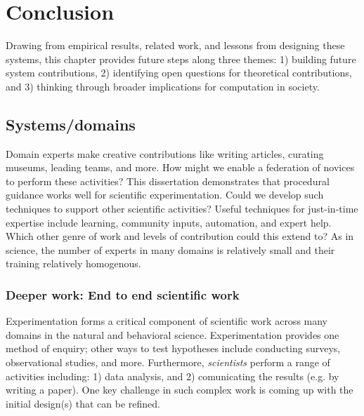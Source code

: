 
\chapter{Conclusion}
Drawing from empirical results, related work, and lessons from designing these systems, this chapter provides future steps along three themes: 1) building future system contributions, 2) identifying open questions for theoretical contributions, and 3) thinking through broader implications for computation in society.

\section{Systems/domains} 

Domain experts make creative contributions like writing articles, curating museums, leading teams, and more. How might we enable a federation of novices to perform these activities? This dissertation demonstrates that procedural guidance works well for scientific experimentation. Could we develop such techniques to support other scientific activities? Useful techniques for just-in-time expertise include learning, community inputs, automation, and expert help. Which other genre of work and levels of contribution could this extend to? As in science, the number of experts in many domains is relatively small and their training relatively homogenous. 

\subsection{Deeper work: End to end scientific work}
Experimentation forms a critical component of scientific work across many domains in the natural and behavioral science. Experimentation provides one method of enquiry; other ways to test hypotheses include conducting surveys, observational studies, and more. Furthermore, \textit{scientists} perform a range of activities including: 1) data analysis, and 2) comunicating the results (e.g. by writing a paper). One key challenge in such complex work is coming up with the initial design(s) that can be refined. 

